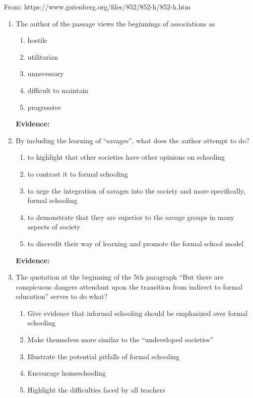 From: https://www.gutenberg.org/files/852/852-h/852-h.htm

\bigskip
\begin{enumerate}
\item The author of the passage views the beginnings of associations as
\begin{enumerate}[label=(\Alph*)]
\item hostile
\item utilitarian
\item unnecessary
\item difficult to maintain
\item progressive 
\end{enumerate}

\bigskip
\textbf{Evidence:} \hrulefill

\bigskip
\item By including the learning of ``savages'', what does the author attempt to do?
\begin{enumerate}[label=(\Alph*)]
\item to highlight that other societies have other opinions on schooling
\item to contrast it to formal schooling
\item to urge the integration of savages into the society and more specifically, formal schooling
\item to demonstrate that they are superior to the savage groups in many aspects of society
\item to discredit their way of learning and promote the formal school model
\end{enumerate}

\bigskip
\textbf{Evidence:} \hrulefill

\item The quotation at the beginning of the 5th paragraph ``But there are conspicuous dangers attendant upon the transition from indirect to formal education'' serves to do what?

\begin{enumerate}[label=(\Alph*)]
\item Give evidence that informal schooling should be emphasized over formal schooling
\item Make themselves more similar to the ``undeveloped societies''
\item Illustrate the potential pitfalls of formal schooling
\item Encourage homeschooling
\item Highlight the difficulties faced by all teachers
\end{enumerate}


\end{enumerate}
